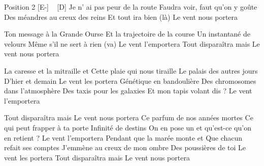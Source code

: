 Position 2
[E-] ~ [D]
Je n' ai pas peur de la route
Faudra voir, faut qu'on y goûte
Des méandres au creux des reins
Et tout ira bien (là)
Le vent nous portera

Ton message à la Grande Ourse
Et la trajectoire de la course
Un instantané de velours
Même s'il ne sert à rien (va)
Le vent l'emportera
Tout disparaîtra mais
Le vent nous portera

La caresse et la mitraille
et Cette plaie qui nous tiraille
Le palais des autres jours
D'hier et demain
Le vent les portera
Génétique en bandoulière
Des chromosomes dans l'atmosphère
Des taxis pour les galaxies
Et mon tapis volant dis ?
Le vent l'emportera

Tout disparaîtra mais
Le vent nous portera
Ce parfum de nos années mortes
Ce qui peut frapper à ta porte
Infinité de destins
On en pose un et qu'est-ce qu'on en retient ?
Le vent l'emportera
Pendant que la marée monte
et Que chacun refait ses comptes
J'emmène au creux de mon ombre
Des poussières de toi
Le vent les portera
Tout disparaîtra mais
Le vent nous portera 